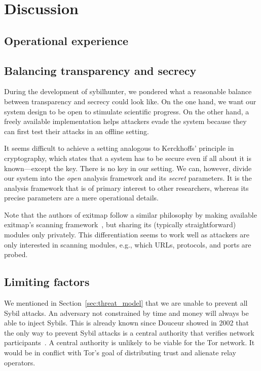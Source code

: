 \section{Discussion}
\label{sec:discussion}

\subsection{Operational experience}
\label{sec:operational}




\subsection{Balancing transparency and secrecy}
\label{sec:secrecy}
During the development of sybilhunter, we pondered what a reasonable balance
between transparency and secrecy could look like.  On the one hand, we want our
system design to be open to stimulate scientific progress.  On the other hand,
a freely available implementation helps attackers evade the system because they
can first test their attacks in an offline setting.

It seems difficult to achieve a setting analogous to Kerckhoffs' principle in
cryptography, which states that a system has to be secure even if all about it
is known---except the key.  There is no key in our setting.  We can, however,
divide our system into the \emph{open} analysis framework and its \emph{secret}
parameters.  It is the analysis framework that is of primary interest to other
researchers, whereas its precise parameters are a mere operational details.

Note that the authors of exitmap follow a similar philosophy by making
available exitmap's scanning framework~\cite{exitmap}, but sharing its
(typically straightforward) modules only privately.  This differentiation seems
to work well as attackers are only interested in scanning modules, e.g., which
URLs, protocols, and ports are probed.

\subsection{Limiting factors}
We mentioned in Section~\ref{sec:threat_model} that we are unable to prevent
all Sybil attacks.  An adversary not constrained by time and money will always
be able to inject Sybils.  This is already known since Douceur showed in 2002
that the only way to prevent Sybil attacks is a central authority that verifies
network participants~\cite{Douceur2002a}.  A central authority is unlikely to
be viable for the Tor network.  It would be in conflict with Tor's goal of
distributing trust and alienate relay operators.

